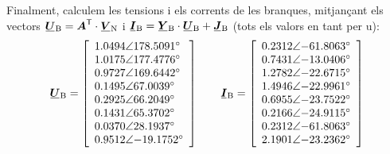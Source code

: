 \begin{exemple}
    Finalment, calculem les tensions i els corrents de les branques,
    mitjançant els vectors $\mcmplx{U}\ped{B} = \transpose{\boldsymbol{A}} \cdot \mcmplx{V}\ped{N}$ i $\mcmplx{I}\ped{B} =  \mcmplx{Y}\ped{B} \cdot
    \mcmplx{U}\ped{B} + \mcmplx{J}\ped{B}$ (tots els valors en tant per u):
    \[
       \mcmplx{U}\ped{B} =
       \begin{bmatrix}\begin{array}{l}
         \complexnum{1,0494:178,5091} \\
         \complexnum{1,0175:177,4776} \\
         \complexnum{0,9727: 169,6442} \\
         \complexnum{0,1495:  67,0039} \\
         \complexnum{0,2925:  66,2049} \\
         \complexnum{0,1431:  65,3702} \\
         \complexnum{0,0370:  28,1937} \\
         \complexnum{0,9512: -19,1752}
       \end{array}\end{bmatrix}
       \qquad
       \mcmplx{I}\ped{B} =
       \begin{bmatrix}\begin{array}{l}
         \complexnum{0,2312:-61,8063} \\
         \complexnum{0,7431:-13,0406} \\
         \complexnum{1,2782:-22,6715} \\
         \complexnum{1,4946:-22,9961} \\
         \complexnum{0,6955:-23,7522} \\
         \complexnum{0,2166:-24,9115} \\
         \complexnum{0,2312:-61,8063} \\
         \complexnum{2,1901:-23,2362}
       \end{array}\end{bmatrix}
    \]


\end{exemple}

